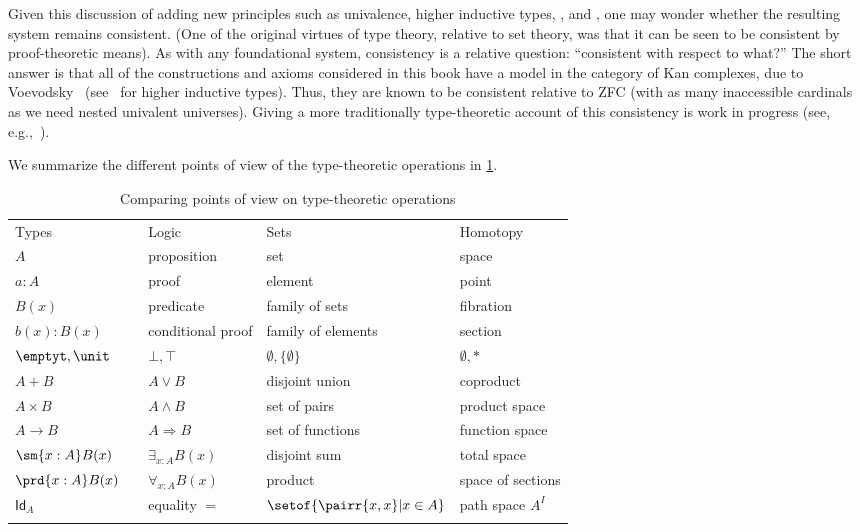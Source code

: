 Given this discussion of adding new principles such as univalence, higher inductive types, \choice{}, and \LEM{}, one may wonder whether the resulting system remains consistent.
(One of the original virtues of type theory, relative to set theory, was that it can be seen to be consistent by proof-theoretic means).
As with any foundational system, consistency is a relative question: ``consistent with respect to what?''
The short answer is that all of the constructions and axioms considered in this book have a model in the category of Kan complexes, due to Voevodsky~\cite{klv:ssetmodel} (see~\cite{ls:hits} for higher inductive types).
Thus, they are known to be consistent relative to ZFC (with as many inaccessible cardinals
%
as we need nested univalent universes).
Giving a more traditionally type-theoretic account of this consistency is work in progress (see,
e.g.,~\cite{lh:canonicity,coquand2012constructive}).

We summarize the different points of view of the type-theoretic operations in \cref{tab:pov}.

\begin{table}[htb]
  \centering
  \OPTsmalltable
 \begin{tabular}{lllll}
    \toprule
       Types && Logic & Sets & Homotopy\\ \addlinespace[2pt]
    \midrule
       $A$ && proposition & set & space\\ \addlinespace[2pt]
       $a:A$ && proof & element & point \\ \addlinespace[2pt]
       $B(x)$ && predicate & family of sets & fibration \\ \addlinespace[2pt]
       $b(x) : B(x)$ && conditional proof & family of elements & section\\ \addlinespace[2pt]
       $\emptyt, \unit$ && $\bot, \top$ & $\emptyset, \{ \emptyset \}$ & $\emptyset, *$\\ \addlinespace[2pt]
       $A + B$ && $A\vee B$ & disjoint union & coproduct\\ \addlinespace[2pt]
       $A\times B$ && $A\wedge B$ & set of pairs & product space\\ \addlinespace[2pt]
       $A\to B$ && $A\Rightarrow B$ & set of functions & function space\\ \addlinespace[2pt]
       $\sm{x:A}B(x)$ &&  $\exists_{x:A}B(x)$ & disjoint sum & total space\\ \addlinespace[2pt]
       $\prd{x:A}B(x)$ &&  $\forall_{x:A}B(x)$ & product & space of sections\\ \addlinespace[2pt]
       $\mathsf{Id}_{A}$ && equality $=$ & $\setof{\pairr{x,x} | x\in A}$ & path space $A^I$ \\ \addlinespace[2pt]
    \bottomrule
  \end{tabular}
  \caption{Comparing points of view on type-theoretic operations}\label{tab:pov}
\end{table}

